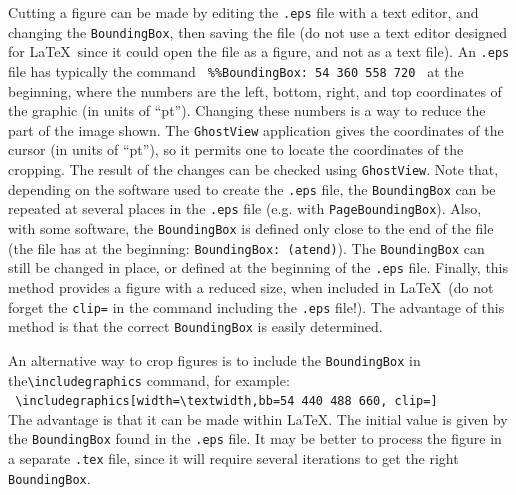 \documentclass[namedreferences,hyperref,optionalrh,solaromanenum]{spr-sola}
\begin{document}
  Cutting a figure can be made by editing the \texttt{.eps} 
file with a text editor, and changing the \texttt{BoundingBox}, 
then saving the file (do not use a text editor designed for \LaTeX\ since 
it could open the file as a figure, and not as a text file).
An \texttt{.eps} file has typically the command
\verb+ %%BoundingBox: 54 360 558 720 + 
at the beginning, where the numbers are the left, bottom, right, and top
coordinates of the graphic (in units of ``pt'').  
Changing these numbers is a way to reduce the part of the image shown. 
The \texttt{GhostView} application gives the coordinates
of the cursor (in units of ``pt''), so it permits one to locate the 
coordinates of the cropping. 
The result of the changes can be checked using \texttt{GhostView}. 
 Note that, depending on the software used to create the \texttt{.eps} file, 
the \texttt{BoundingBox} can be repeated at several places in the
\texttt{.eps} file (e.g. with \texttt{PageBoundingBox}). 
Also, with some software,
the \texttt{BoundingBox} is defined only close to the end of the file
(the file has at the beginning: \texttt{BoundingBox: (atend)}).
The \texttt{BoundingBox} can still be changed
in place, or defined at the beginning of the \texttt{.eps} file. 
   Finally, this method provides a figure with a reduced size, when
included in \LaTeX\ (do not forget the \texttt{clip=} 
in the command including the \texttt{.eps} file!).     
The advantage of this method is that the correct \texttt{BoundingBox}
is easily determined.

   An alternative way to crop figures is to include the \texttt{BoundingBox}
in the\linebreak \verb+\includegraphics+ command, for example:\\
\verb+ \includegraphics[width=\textwidth,bb=54 440 488 660, clip=]+ \\
  The advantage
is that it can be made within \LaTeX . The initial value is given
by the \texttt{BoundingBox} found in the \texttt{.eps} file.
It may be better to process the
figure in a separate \texttt{.tex} file, since it will require several 
iterations to get the right \texttt{BoundingBox}.
   
   
\end{document}
